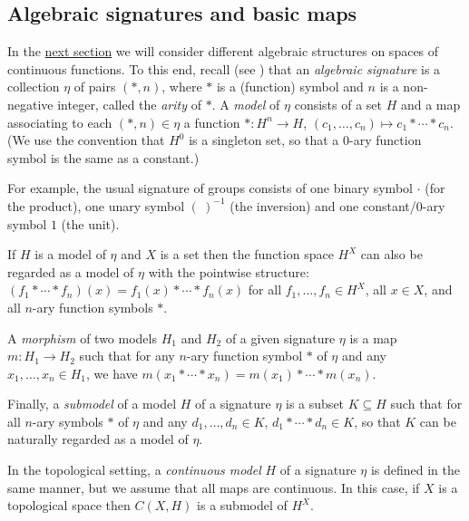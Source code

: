 \documentclass[letter,11pt]{amsart}
\theoremstyle{plain}		\newtheorem{theorem}[generalnumbering]{Theorem}
\theoremstyle{plain}		\newtheorem{corollary}[generalnumbering]{Corollary}
\theoremstyle{definition}		\newtheorem{definition}[generalnumbering]{Definition}
\theoremstyle{definition}		\newtheorem{example}[generalnumbering]{Example}
\theoremstyle{plain}		\newtheorem{proposition}[generalnumbering]{Proposition}
\theoremstyle{plain}		\newtheorem{lemma}[generalnumbering]{Lemma}
\theoremstyle{plain}    \newtheorem{plainstyle}[generalnumbering]{\namefordifferentenvironment}
\theoremstyle{plain}    \newtheorem*{plainstyle*}{\namefordifferentenvironment}
\theoremstyle{definition}    \newtheorem{definitionstyle}[generalnumbering]{\namefordifferentenvironment}
\theoremstyle{definition}    \newtheorem*{definitionstyle*}{\namefordifferentenvironment}
\begin{document}
\subsection{Algebraic signatures and basic maps}

In the \hyperref[sectionconsequences]{next section} we will consider different algebraic structures on spaces of continuous functions. To this end, recall (see \cite{MR1221741}) that an \emph{algebraic signature} is a collection $\eta$ of pairs $(*,n)$, where $*$  is a (function) symbol and $n$ is a non-negative integer, called the \emph{arity} of $*$. A \emph{model} of $\eta$ consists of a set $H$ and a map associating to each $(*,n)\in\eta$ a function $*\colon H^n\to H$, $(c_1,\ldots,c_n)\mapsto c_1*\cdots*c_n$. (We use the convention that $H^0$ is a singleton set, so that a $0$-ary function symbol is the same as a constant.)

For example, the usual signature of groups consists of one binary symbol $\cdot$ (for the product), one unary symbol $(\ )^{-1}$ (the inversion) and one constant/0-ary symbol $1$ (the unit).

If $H$ is a model of $\eta$ and $X$ is a set then the function space $H^X$ can also be regarded as a model of $\eta$ with the pointwise structure: $(f_1*\cdots*f_n)(x)=f_1(x)*\cdots*f_n(x)$ for all $f_1,\ldots,f_n\in H^X$, all $x\in X$, and all $n$-ary function symbols $\ast$.

A \emph{morphism} of two models $H_1$ and $H_2$ of a given signature $\eta$ is a map $m\colon H_1\to H_2$ such that for any $n$-ary function symbol $*$ of $\eta$ and any $x_1,\ldots,x_n\in H_1$, we have $m(x_1*\cdots*x_n)=m(x_1)*\cdots*m(x_n)$.

Finally, a \emph{submodel} of a model $H$ of a signature $\eta$ is a subset $K\subseteq H$ such that for all $n$-ary symbols $*$ of $\eta$ and any $d_1,\ldots,d_n\in K$, $d_1*\cdots*d_n\in K$, so that $K$ can be naturally regarded as a model of $\eta$.

In the topological setting, a \emph{continuous model} $H$ of a signature $\eta$ is defined in the same manner, but we assume that all maps are continuous. In this case, if $X$ is a topological space then $C(X,H)$ is a submodel of $H^X$.
\end{document}
